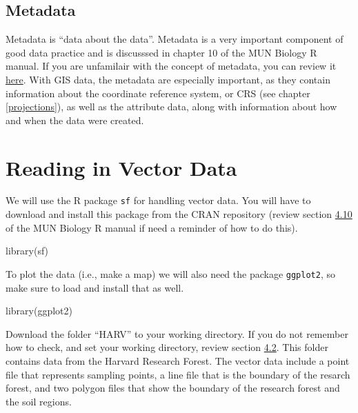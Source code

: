 \documentclass[
]{book}
\newenvironment{Shaded}{\begin{snugshade}}{\end{snugshade}}
\newcommand{\FunctionTok}[1]{\textcolor[rgb]{0.00,0.00,0.00}{#1}}
\newcommand{\NormalTok}[1]{#1}
\begin{document}
\hypertarget{metadata}{%
\section{Metadata}\label{metadata}}

Metadata is ``data about the data''. Metadata is a very important component of good data practice and is discusssed in chapter 10 of the MUN Biology R manual. If you are unfamilair with the concept of metadata, you can review it \href{https://ahurford.github.io/quant-guide-all-courses/data.html}{here}. With GIS data, the metadata are especially important, as they contain information about the coordinate reference system, or CRS (see chapter \ref{projections}), as well as the attribute data, along with information about how and when the data were created.

\hypertarget{vector}{%
\chapter{Reading in Vector Data}\label{vector}}

We will use the R package \texttt{sf} for handling vector data. You will have to download and install this package from the CRAN repository (review section \href{https://ahurford.github.io/quant-guide-all-courses/rintro.html\#r-packages}{4.10} of the MUN Biology R manual if need a reminder of how to do this).

\begin{Shaded}
\begin{Highlighting}[]
\FunctionTok{library}\NormalTok{(sf)}
\end{Highlighting}
\end{Shaded}

To plot the data (i.e., make a map) we will also need the package \texttt{ggplot2}, so make sure to load and install that as well.

\begin{Shaded}
\begin{Highlighting}[]
\FunctionTok{library}\NormalTok{(ggplot2)}
\end{Highlighting}
\end{Shaded}

Download the folder ``HARV'' to your working directory. If you do not remember how to check, and set your working directory, review section \href{https://ahurford.github.io/quant-guide-all-courses/rintro.html\#working-directory}{4.2}. This folder contains data from the Harvard Research Forest. The vector data include a point file that represents sampling points, a line file that is the boundary of the resarch forest, and two polygon files that show the boundary of the research forest and the soil regions.
\end{document}
